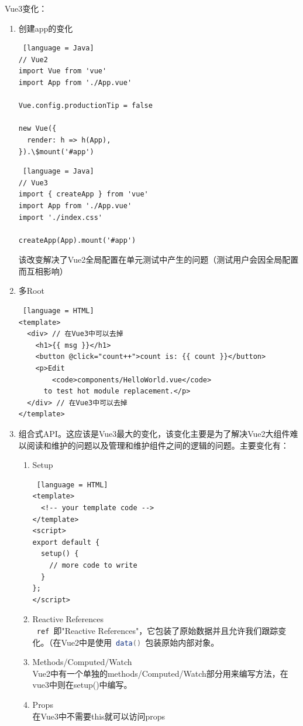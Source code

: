 Vue3变化：
\begin{enumerate}
  \item 创建app的变化
        \begin{lstlisting} [language = Java]
// Vue2
import Vue from 'vue'
import App from './App.vue'

Vue.config.productionTip = false

new Vue({
  render: h => h(App),
}).\$mount('#app')
    \end{lstlisting}
        \begin{lstlisting} [language = Java]
// Vue3
import { createApp } from 'vue'
import App from './App.vue'
import './index.css'

createApp(App).mount('#app')
    \end{lstlisting}
        该改变解决了Vue2全局配置在单元测试中产生的问题（测试用户会因全局配置而互相影响）
  \item 多Root
        \begin{lstlisting} [language = HTML]
<template>
  <div> // 在Vue3中可以去掉
    <h1>{{ msg }}</h1>
    <button @click="count++">count is: {{ count }}</button>
    <p>Edit 
        <code>components/HelloWorld.vue</code> 
      to test hot module replacement.</p>
  </div> // 在Vue3中可以去掉
</template>
\end{lstlisting}
  \item 组合式API。这应该是Vue3最大的变化，该变化主要是为了解决Vue2大组件难以阅读和维护的问题以及管理和维护组件之间的逻辑的问题。主要变化有：
        \begin{enumerate}
          \item Setup
                \begin{lstlisting} [language = HTML]
<template>
  <!-- your template code -->
</template>
<script>
export default {
  setup() {
    // more code to write
  }
};
</script>
            \end{lstlisting}
          \item Reactive References\\
                \lstinline[language = Java]| ref |即"Reactive References"，它包装了原始数据并且允许我们跟踪变化。（在Vue2中是使用\lstinline[language = Java]| data() |包装原始内部对象。
          \item Methods/Computed/Watch\\
                Vue2中有一个单独的methods/Computed/Watch部分用来编写方法，在vue3中则在setup()中编写。
          \item Props\\
                在Vue3中不需要this就可以访问props

\end{enumerate}
\end{enumerate}

